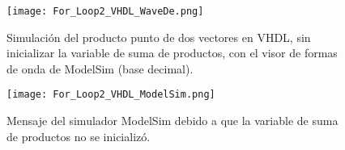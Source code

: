 \begin{figure}[ht]
	\centering
	\texttt{[image: For\_Loop2\_VHDL\_WaveDe.png]}
	\caption{Simulación del producto punto de dos vectores en VHDL, sin inicializar la variable de suma de productos, con el visor de formas de onda de ModelSim (base decimal). \label{fig:for_loop2_vhdl_wavede}}
\end{figure}

\begin{figure}[ht]
	\centering
	\texttt{[image: For\_Loop2\_VHDL\_ModelSim.png]}
	\caption{Mensaje del simulador ModelSim debido a que la variable de suma de productos no se inicializó. \label{fig:for_loop2_vhdl_modelsim}}
\end{figure}